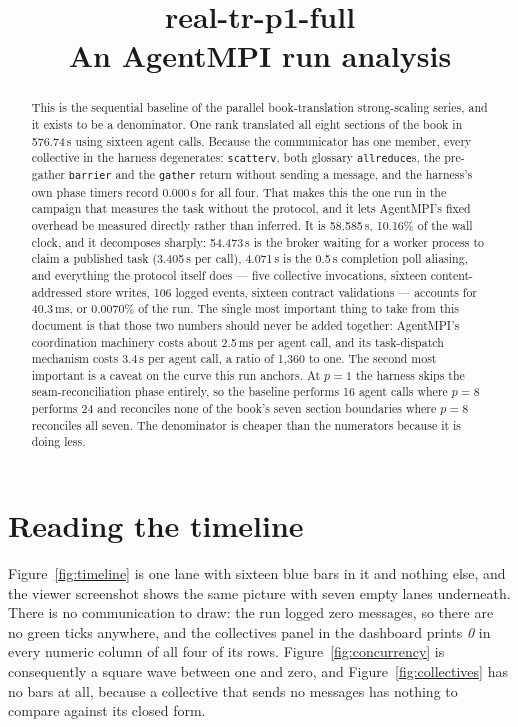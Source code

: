 \documentclass[11pt]{article}
\title{\textbf{real-tr-p1-full}\\[2pt]\large An AgentMPI run analysis}
\author{}
\date{}
\begin{document}
\maketitle

\begin{abstract}
This is the sequential baseline of the parallel book-translation strong-scaling series, and it
exists to be a denominator. One rank translated all eight sections of the book in 576.74\,s
using sixteen agent calls. Because the communicator has one member, every collective in the
harness degenerates: \texttt{scatterv}, both glossary \texttt{allreduce}s, the pre-gather
\texttt{barrier} and the \texttt{gather} return without sending a message, and the harness's own
phase timers record 0.000\,s for all four. That makes this the one run in the campaign that
measures the task without the protocol, and it lets AgentMPI's fixed overhead be measured
directly rather than inferred. It is 58.585\,s, 10.16\% of the wall clock, and it decomposes
sharply: 54.473\,s is the broker waiting for a worker process to claim a published task
(3.405\,s per call), 4.071\,s is the 0.5\,s completion poll aliasing, and everything the
protocol itself does --- five collective invocations, sixteen content-addressed store writes,
106 logged events, sixteen contract validations --- accounts for 40.3\,ms, or 0.0070\% of the
run. The single most important thing to take from this document is that those two numbers should
never be added together: AgentMPI's coordination machinery costs about 2.5\,ms per agent call,
and its task-dispatch mechanism costs 3.4\,s per agent call, a ratio of 1{,}360 to one. The
second most important is a caveat on the curve this run anchors. At $p=1$ the harness skips the
seam-reconciliation phase entirely, so the baseline performs 16 agent calls where $p=8$ performs
24 and reconciles none of the book's seven section boundaries where $p=8$ reconciles all seven.
The denominator is cheaper than the numerators because it is doing less.
\end{abstract}



\section{Reading the timeline}

Figure~\ref{fig:timeline} is one lane with sixteen blue bars in it and nothing else, and the
viewer screenshot shows the same picture with seven empty lanes underneath. There is no
communication to draw: the run logged zero messages, so there are no green ticks anywhere, and
the collectives panel in the dashboard prints \emph{0} in every numeric column of all four of its
rows. Figure~\ref{fig:concurrency} is consequently a square wave between one and zero, and
Figure~\ref{fig:collectives} has no bars at all, because a collective that sends no messages has
nothing to compare against its closed form.
\end{document}
